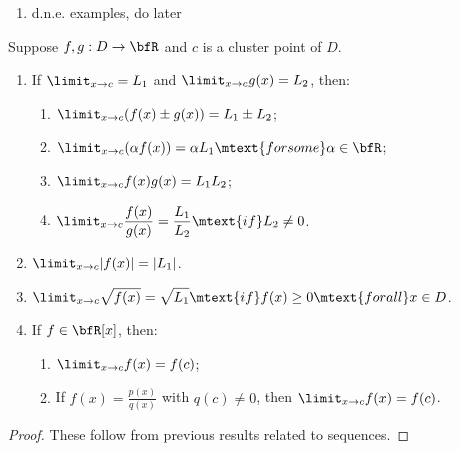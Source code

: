     \begin{example}
        \phantom{a}
        \begin{enumerate}[label = (\arabic*)]
            \item {\color{red} d.n.e. examples, do later}
        \end{enumerate}
    \end{example}

    \begin{theorem}
        Suppose $f,g:D \rightarrow \bfR$ and $c$ is a cluster point of $D$.
        \begin{enumerate}[label = (\arabic*)]
            \item If $\limit_{x \rightarrow c} = L_1$ and $\limit_{x \rightarrow c}g(x) = L_2$, then:
                \begin{enumerate}[label = (\roman*)]
                    \item $\displaystyle \limit_{x \rightarrow c}(f(x) \pm g(x)) = L_1 \pm L_2$;
                    \item $\displaystyle \limit_{x \rightarrow c}(\alpha f(x)) = \alpha L_1 \mtext{for some} \alpha \in \bfR$;
                    \item $\displaystyle \limit_{x \rightarrow c}f(x)g(x) = L_1 L_2$;
                    \item $\displaystyle \limit_{x \rightarrow c} \frac{f(x)}{g(x)} = \frac{L_1}{L_2} \mtext{if} L_2 \neq 0$.
                \end{enumerate}

            \item $\displaystyle \limit_{x \rightarrow c}|f(x)| = |L_1|$.
            \item $\displaystyle \limit_{x \rightarrow c}\sqrt{f(x)} = \sqrt{L_1} \mtext{if} f(x) \geq 0 \mtext{for all} x\in D$.
            \item If $f \in \bfR[x]$, then:
                \begin{enumerate}[label = (\arabic*)]
                    \item $\displaystyle \limit_{x \rightarrow c}f(x) = f(c)$;
                    \item If $f(x) = \frac{p(x)}{q(x)}$ with $q(c) \neq 0$, then $\displaystyle \limit_{x \rightarrow c}f(x) = f(c)$.
                \end{enumerate}
        \end{enumerate}
    \end{theorem}
        \begin{proof}
            These follow from previous results related to sequences.
        \end{proof}

